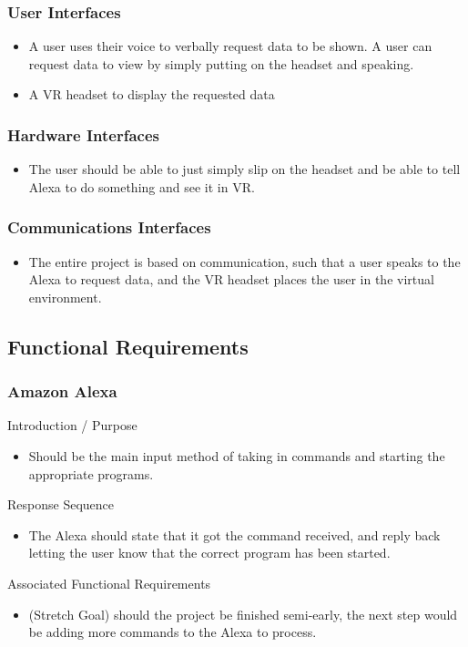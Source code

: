 \documentclass[onecolumn, draftclsnofoot,10pt, compsoc]{IEEEtran}
\begin{document}
        \subsubsection{User Interfaces}
            \begin{itemize}
                \item A user uses their voice to verbally request data to be shown. A user can request data to view by simply putting on the headset and speaking.
                \item A VR headset to display the requested data
            \end{itemize}

            \subsubsection{Hardware Interfaces}
            \begin{itemize}
                \item The user should be able to just simply slip on the headset and be able to tell Alexa to do something and see it in VR.
            \end{itemize}

            \subsubsection{Communications Interfaces}
            \begin{itemize}
                \item The entire project is based on communication, such that a user speaks to the Alexa to request data, and the VR headset places the user in the virtual environment.
            \end{itemize}

    \subsection{Functional Requirements}

        \subsubsection{Amazon Alexa}
            Introduction / Purpose
            \begin{itemize}
                \item Should be the main input method of taking in commands and starting the appropriate programs.
            \end{itemize}
            Response Sequence
            \begin{itemize}
                \item The Alexa should state that it got the command received, and reply back letting the user know that the correct program has been started.
            \end{itemize}
            Associated Functional Requirements
            \begin{itemize}
                \item (Stretch Goal) should the project be finished semi-early, the next step would be adding more commands to the Alexa to process.

            \end{itemize}
\end{document}
